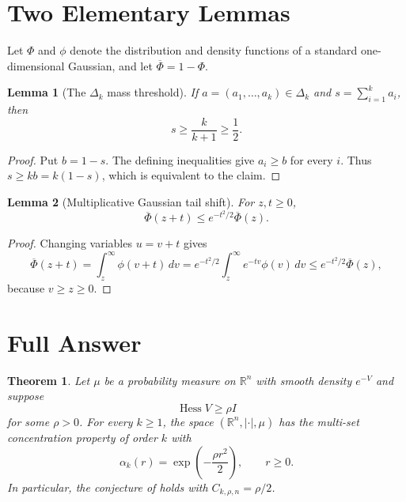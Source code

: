 \documentclass[11pt]{amsart}
\newtheorem{theorem}{Theorem}
\newtheorem{lemma}{Lemma}
\newcommand{\R}{\mathbb R}
\begin{document}
\section*{Two Elementary Lemmas}

Let $\Phi$ and $\phi$ denote the distribution and density functions of a
standard one-dimensional Gaussian, and let
$\overline\Phi=1-\Phi$.

\begin{lemma}[The $\Delta_k$ mass threshold]\label{lem:mass}
If $a=(a_1,\ldots,a_k)\in\Delta_k$ and
$s=\sum_{i=1}^k a_i$, then
\[
 s\geq\frac{k}{k+1}\geq\frac12.
\]
\end{lemma}

\begin{proof}
Put $b=1-s$.  The defining inequalities give $a_i\geq b$ for every $i$.
Thus $s\geq kb=k(1-s)$, which is equivalent to the claim.
\end{proof}

\begin{lemma}[Multiplicative Gaussian tail shift]\label{lem:tail}
For $z,t\geq0$,
\[
 \overline\Phi(z+t)
 \leq e^{-t^2/2}\overline\Phi(z).
\]
\end{lemma}

\begin{proof}
Changing variables $u=v+t$ gives
\[
 \overline\Phi(z+t)
 =\int_z^\infty\phi(v+t)\,dv
 =e^{-t^2/2}\int_z^\infty e^{-tv}\phi(v)\,dv
 \leq e^{-t^2/2}\overline\Phi(z),
\]
because $v\geq z\geq0$.
\end{proof}

\section*{Full Answer}

\begin{theorem}\label{thm:answer}
Let $\mu$ be a probability measure on $\R^n$ with smooth density
$e^{-V}$ and suppose
\[
 \operatorname{Hess}V\geq\rho I
\]
for some $\rho>0$.  For every $k\geq1$, the space
$(\R^n,|\cdot|,\mu)$ has the multi-set concentration property of order
$k$ with
\[
 \alpha_k(r)=\exp\!\left(-\frac{\rho r^2}{2}\right),
 \qquad r\geq0.
\]
In particular, the conjecture of \cite[Section 5.1]{GH} holds with
$C_{k,\rho,n}=\rho/2$.
\end{theorem}
\end{document}
